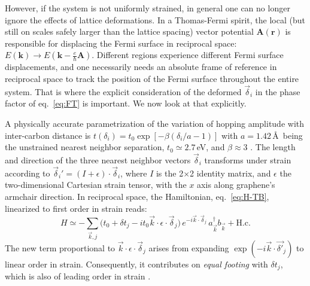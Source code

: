 However, if the system is not uniformly strained, in general one can no longer ignore the effects of lattice deformations.
In a Thomas-Fermi spirit, the local (but still on scales safely larger than the lattice spacing) vector potential $\bm{A}(\bm{r})$ is responsible for displacing the Fermi surface in reciprocal space: $E(\bm{k})\to E(\bm{k}-\frac{e}{\hbar}\bm{A})$.
Different regions experience different Fermi surface displacements, and one necessarily needs an absolute frame of reference in reciprocal space to track the position of the Fermi surface throughout the entire system.
That is where the explicit consideration of the deformed $\vec{\delta}_i$ in the phase factor of eq.~\eqref{eq:FT} is important.
We now look at that explicitly.

A physically accurate parametrization of the variation of hopping amplitude with inter-carbon distance is $t(\delta_i)=t_0 \exp[-\beta (\delta_i/a-1)]$ with $a=1.42$\,\AA\, being the unstrained nearest neighbor separation, $t_0\simeq 2.7$\,eV, and $\beta\approx 3$ \cite{Pereira2009,Ribeiro2009,CastroNeto2009}.
The length and direction of the three nearest neighbor vectors $\vec{\delta}_i$ transforms under strain according to $\vec{\delta}_i'=(I+\epsilon)\cdot\vec{\delta}_i$, where $I$ is the 2$\times$2 identity matrix, and $\epsilon$ the two-dimensional Cartesian strain tensor, with the $x$ axis along graphene's armchair direction.
In reciprocal space, the Hamiltonian, eq.~\eqref{eq:H-TB}, linearized to first order in strain reads:
\begin{equation}
  H \simeq -\sum_{\vec{k},j} \bigl(
  t_0 + \delta t_j - it_0\vec{k}\cdot\epsilon\cdot\vec{\delta}_j
  \bigr) \, e^{-i\vec{k}\cdot\vec{\delta}_j} \,
  a_{\vec{k}}^{\dagger}b_{\vec{k}} + \text{H.c.}
  \label{eq:H-TB-strain}
\end{equation}
The new term proportional to $\vec{k}\cdot\epsilon\cdot\vec{\delta}_j$ arises from expanding $\exp(-i\vec{k}\cdot\vec{\delta'}_j)$ to linear order in strain. Consequently, it contributes on \emph{equal footing} with $\delta t_j$, which is also of leading order in strain \cite{CastroNeto2009}.

